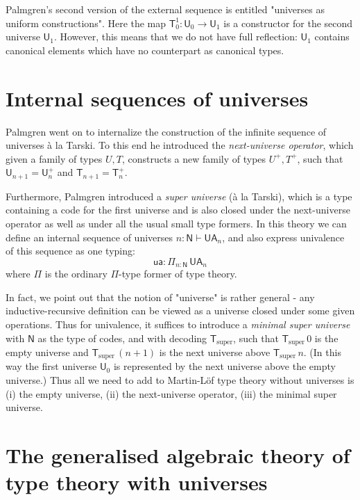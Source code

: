 \documentclass[11pt,a4paper]{article}
\def\NN{\mathsf{N}}
\def\UU{\mathsf{U}}
\newcommand{\N}{\mathsf{N}}
\newcommand{\T}{\mathsf{T}}
\newcommand{\Tsuper}{\T_{\mathrm{super}}}
\newcommand{\ua}{\mathsf{ua}}
\newcommand{\UA}{\mathsf{UA}}
\begin{document}
Palmgren's second version of the external sequence is entitled "universes as uniform constructions". Here the map $\T_0^1 : \UU_0 \to \UU_1$ is a constructor for the second universe $\UU_1$. However, this means that we do not have full reflection: $\UU_1$ contains canonical elements which have no counterpart as canonical types.

\section{Internal sequences of universes}

Palmgren \cite{palmgren:phd} went on to internalize the construction of the infinite sequence of universes  \`a la Tarski. To this end he introduced the {\em next-universe operator}, which given a family of types $U, T$, constructs a new family of types $U^+, T^+$, such that $ \UU_{n+1} = \UU_n^+$ and $\T_{n+1} = \T_n^+$.

Furthermore, Palmgren introduced a {\em super universe} (\`a la Tarski), which is a type containing a code for the first universe and is also closed under the next-universe operator as well as under all the usual small type formers. In this theory we can define an internal sequence of universes $n : \NN \vdash \UA_n$, and also express univalence of this sequence as one typing:
$$
\ua : \Pi_{n : \N}\, \UA_n
$$
where $\Pi$ is the ordinary $\Pi$-type former of type theory.

In fact, we point out that the notion of "universe" is rather general - any inductive-recursive definition can be viewed as a universe closed under some given operations. Thus for univalence, it suffices to introduce a {\em minimal super universe} with $\N$ as the type of codes, and with decoding $\Tsuper$,
such that $\Tsuper\,0$ is the empty universe and $\Tsuper\,(n + 1)$ is the next universe above $\Tsuper\,n$. (In this way the first universe $\UU_0$ is represented by the next universe above the empty universe.) Thus all we need to add to Martin-Löf type theory without universes is (i) the empty universe, (ii) the next-universe operator, (iii) the minimal super universe.


\section{The generalised algebraic theory of type theory with universes}
\end{document}
